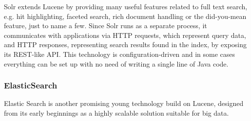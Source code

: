 Solr extends Lucene by providing many useful features related to full text search, e.g. hit highlighting,
faceted search, rich document handling or the did-you-mean feature, just to name a few. 
Since Solr runs as a separate process, it communicates with applications via HTTP requests, which represent query data, and HTTP responses, representing search results found in the index, by exposing its REST-like API. 
This technology is configuration-driven and in some cases everything can be set up with no need of writing a single line of Java code. 


\subsubsection{ElasticSearch}

Elastic Search \cite{ElasticSearchHome} is another promising young technology build on Lucene, designed from its early beginnings as a highly scalable solution suitable for big data.
